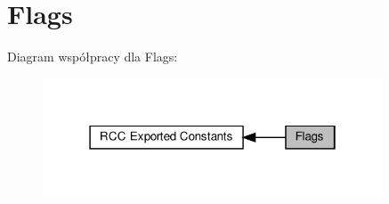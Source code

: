 \hypertarget{group___r_c_c___flag}{}\section{Flags}
\label{group___r_c_c___flag}
Diagram współpracy dla Flags\+:\nopagebreak
\begin{figure}[H]
\begin{center}
\leavevmode
\includegraphics[width=286pt]{group___r_c_c___flag}
\end{center}
\end{figure}
